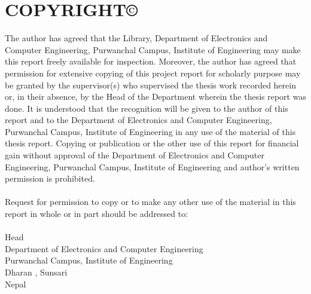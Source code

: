 \newpage
{}
\section*{COPYRIGHT\copyright}
\par
The author has agreed that the Library, Department of Electronics and Computer Engineering, Purwanchal Campus, Institute of Engineering may make this report freely
available for inspection. Moreover, the author has agreed that permission for extensive
copying of this project report for scholarly purpose may be granted by the supervisor(s)
who supervised the thesis work recorded herein or, in their absence, by the Head of
the Department wherein the thesis report was done. It is understood that the
recognition will be given to the author of this report and to the Department of
Electronics and Computer Engineering, Purwanchal Campus, Institute of Engineering in
any use of the material of this thesis report. Copying or publication or the other use of
this report for financial gain without approval of the Department of Electronics and
Computer Engineering, Purwanchal Campus, Institute of Engineering and author’s
written permission is prohibited.\\
\\
Request for permission to copy or to make any other use of the material in this report
in whole or in part should be addressed to:\\
\\
Head\\
Department of Electronics and Computer Engineering\\
Purwanchal Campus, Institute of Engineering\\
Dharan , Sunsari\\
Nepal